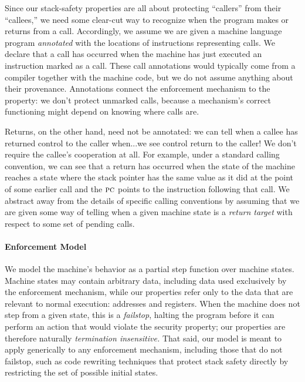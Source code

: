 \documentclass[10pt,conference]{ieeetran}%
\theoremstyle{definition}
\begin{document}
Since our stack-safety properties are all about protecting ``callers'' from
their ``callees,'' we need some clear-cut way to recognize when the program
makes or returns from a call.  Accordingly, we assume we are given a machine
language program {\em annotated} with the locations of instructions
representing calls.  We declare that a call has occurred when the machine
has just executed an instruction marked as a call.
%
These call annotations would typically come from a compiler together with
the machine code, but we do not assume anything about their provenance.
Annotations connect the enforcement mechanism to the property: we don't
protect unmarked calls, because a mechanism's correct functioning might
depend on knowing where calls are.

Returns, on the other hand, need not be annotated: we can tell when a callee
has returned control to the caller when...we see control return to the
caller! We don't require the callee's cooperation at all.
\ifaftersubmission{}\fi
For example, under a standard calling convention, we can see that a
return has occurred when the state of the machine reaches a state where
the stack pointer has the same value as it did at the point of some earlier
call and the $\textsc{pc}$ points to the instruction following that call.  We
abstract away from the details of specific calling conventions by assuming
that we are given some way of telling when a given machine state is a
{\em return target} with respect to some set of pending calls.

\paragraph*{Enforcement Model}

We model the machine's behavior as a partial step function over machine states.
Machine states may contain arbitrary data, including data used exclusively by the
enforcement mechanism, while our properties refer only to the data that are
relevant to normal execution: addresses and registers.
When the machine does not step from a given state, this
is a {\em failstop}, halting the program before it can perform an
action that would violate the security property;
our properties are therefore naturally \emph{termination insensitive.}
%
That said, our model is meant to apply generically to any enforcement mechanism,
including those that do not failstop, such as
code rewriting techniques that protect stack safety directly by
restricting the set of possible initial states.
\end{document}
